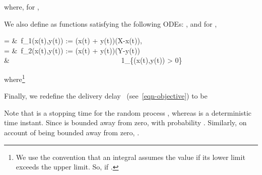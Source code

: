 \documentclass[10pt,journal,letterpaper]{IEEEtran}
\begin{document}
where, for ,

We also define  as functions
satisfying the following ODEs: , and for ,

 = &~f_1(x(t),y(t)) := \Lambda (x(t) + y(t))(X-x(t)),\label{eqn:f-1} \\
 = &~f_2(x(t),y(t)) := \Lambda (x(t) + y(t))(Y-y(t)) \nonumber\\
                               & \ \ \ \ \ \ \ \ \ \ \ \ \ \ \ \ \ \ \ \ \ \ \ \ \ \ \ \ \ \ \ 1_{\{\phi(x(t),y(t)) > 0\}}\label{eqn:f-2}

where\footnote{We use the convention that an integral assumes the value 
if its lower limit exceeds the upper limit. So,  if .}

Finally, we redefine the delivery delay ~(see~\eqref{eqn-objective}) to be

 Note that  is a stopping time for the random
process , whereas  is a deterministic time instant. Since  is bounded away from
zero,  with probability . Similarly, on account of  being bounded away from
zero, .
\end{document}
